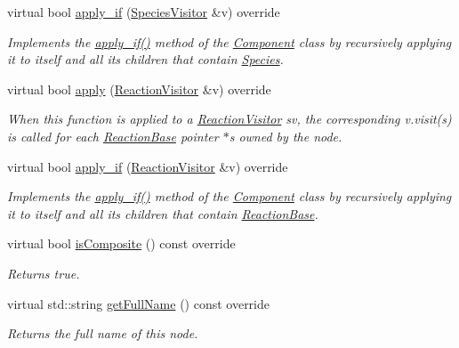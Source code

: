 \begin{DoxyCompactItemize}
virtual bool \hyperlink{classchem_1_1Composite_ab56b1419cbaca60564fa01aacb2c70fd}{apply\-\_\-if} (\hyperlink{classchem_1_1SpeciesVisitor}{Species\-Visitor} \&v) override
\begin{DoxyCompactList}\small\item\em Implements the \hyperlink{classchem_1_1Composite_a1cb289fb89fefeda7090a44e038e017a}{apply\-\_\-if()} method of the \hyperlink{classchem_1_1Component}{Component} class by recursively applying it to itself and all its children that contain \hyperlink{classchem_1_1Species}{Species}. \end{DoxyCompactList}\item 
virtual bool \hyperlink{classchem_1_1Composite_aa4a608ee92aaaa6e0d63278595707474}{apply} (\hyperlink{classchem_1_1ReactionVisitor}{Reaction\-Visitor} \&v) override
\begin{DoxyCompactList}\small\item\em When this function is applied to a \hyperlink{classchem_1_1ReactionVisitor}{Reaction\-Visitor} sv, the corresponding v.\-visit(s) is called for each \hyperlink{classchem_1_1ReactionBase}{Reaction\-Base} pointer $\ast$s owned by the node. \end{DoxyCompactList}\item 
virtual bool \hyperlink{classchem_1_1Composite_a6103789572ae9c0112eedd71a0d4e37f}{apply\-\_\-if} (\hyperlink{classchem_1_1ReactionVisitor}{Reaction\-Visitor} \&v) override
\begin{DoxyCompactList}\small\item\em Implements the \hyperlink{classchem_1_1Composite_a1cb289fb89fefeda7090a44e038e017a}{apply\-\_\-if()} method of the \hyperlink{classchem_1_1Component}{Component} class by recursively applying it to itself and all its children that contain \hyperlink{classchem_1_1ReactionBase}{Reaction\-Base}. \end{DoxyCompactList}\item 
virtual bool \hyperlink{classchem_1_1Composite_a939b2b81dfb961ebfa0a09243162a9f7}{is\-Composite} () const override
\begin{DoxyCompactList}\small\item\em Returns true. \end{DoxyCompactList}\item 
virtual std\-::string \hyperlink{classchem_1_1Composite_aa20f744718bd0dd17f8cf09d296231fb}{get\-Full\-Name} () const override
\begin{DoxyCompactList}\small\item\em Returns the full name of this node. \end{DoxyCompactList}\item 

\end{DoxyCompactItemize}
